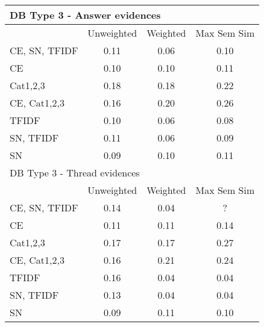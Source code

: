 \documentclass[conference]{IEEEtran}
\begin{document}
\begin{table*}[!h]
\begin{tabular}{l||ccc}
		\multicolumn{4}{l}{DB Type 3 - Answer evidences}\\\hline\hline
		& Unweighted & Weighted & Max Sem Sim\\
		CE, SN, TFIDF & 0.11 & 0.06 & 0.10\\
		CE & 0.10 & 0.10 & 0.11\\
		Cat1,2,3 & 0.18 & 0.18 & 0.22\\
		CE, Cat1,2,3 & 0.16 & 0.20 & 0.26\\
		TFIDF & 0.10 & 0.06 & 0.08\\
		SN, TFIDF & 0.11 & 0.06 & 0.09\\
		SN & 0.09 & 0.10 & 0.11\\
		\hline
		
		\multicolumn{4}{l}{DB Type 3 - Thread evidences}\\\hline\hline
		& Unweighted & Weighted & Max Sem Sim\\
		CE, SN, TFIDF & 0.14 & 0.04 & ?\\
		CE & 0.11 & 0.11 & 0.14\\
		Cat1,2,3 & 0.17 & 0.17 & 0.27\\
		CE, Cat1,2,3 & 0.16 & 0.21 & 0.24\\
		TFIDF & 0.16 & 0.04 & 0.04\\
		SN, TFIDF & 0.13 & 0.04 & 0.04\\
		SN & 0.09 & 0.11 & 0.10\\
		\hline
		
	\end{tabular}
\end{table*}
\end{document}
